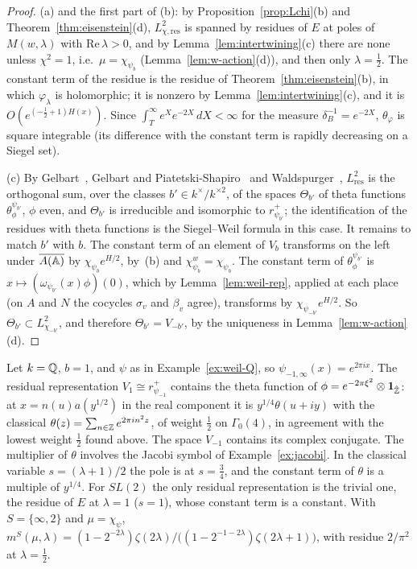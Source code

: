 \begin{proof}
(a) and the first part of (b): by Proposition~\ref{prop:Lchi}(b) and
Theorem~\ref{thm:eisenstein}(d), $L^2_{\chi,\mathrm{res}}$ is spanned by
residues of $E$ at poles of $M(w,\lambda)$ with $\mathrm{Re}\,\lambda>0$,
and by Lemma~\ref{lem:intertwining}(c) there are none unless
$\chi^2=1$, i.e.\ $\mu=\chi_{\psi_b}$ (Lemma~\ref{lem:w-action}(d)), and
then only $\lambda=\frac12$. The constant term of the residue is the
residue of Theorem~\ref{thm:eisenstein}(b), in which $\varphi_\lambda$ is
holomorphic; it is nonzero by Lemma~\ref{lem:intertwining}(c), and it is
$O(e^{(-\frac12+1)H(x)})$. Since $\int_T^\infty e^{X}e^{-2X}\,dX<\infty$
for the measure $\delta_B^{-1}=e^{-2X}$, $\theta_\varphi$ is square
integrable (its difference with the constant term is rapidly decreasing
on a Siegel set).

(c) By Gelbart~\cite{Ge76}, Gelbart and
Piatetski-Shapiro~\cite{GPS80} and Waldspurger~\cite{Wa80},
$L^2_{\mathrm{res}}$ is the orthogonal sum, over the classes $b'\in
k^\times/k^{\times2}$, of the spaces $\Theta_{b'}$ of theta functions
$\theta^{\psi_{b'}}_\phi$, $\phi$ even, and $\Theta_{b'}$ is irreducible
and isomorphic to $r^+_{\psi_{b'}}$; the identification of the residues
with theta functions is the Siegel--Weil formula in this case. It remains
to match $b'$ with $b$. The constant term of an element of $V_b$
transforms on the left under $\overline{A(\mathbb{A})}$ by $\chi_{\psi_b}e^{H/2}$,
by~(b) and $\chi_{\psi_b}^w=\chi_{\psi_b}$. The constant term of
$\theta^{\psi_{b'}}_\phi$ is $x\mapsto(\omega_{\psi_{b'}}(x)\phi)(0)$, which
by Lemma~\ref{lem:weil-rep}, applied at each place (on $A$ and $N$ the
cocycles $\sigma_v$ and $\beta_v$ agree), transforms by
$\chi_{\psi_{-b'}}e^{H/2}$. So $\Theta_{b'}\subset L^2_{\chi_{-b'}}$, and
therefore $\Theta_{b'}=V_{-b'}$, by the uniqueness in
Lemma~\ref{lem:w-action}(d).
\end{proof}

\begin{example}\label{ex:theta}
Let $k=\mathbb{Q}$, $b=1$, and $\psi$ as in Example~\ref{ex:weil-Q}, so
$\psi_{-1,\infty}(x)=e^{2\pi ix}$. The residual representation
$V_1\cong r^+_{\psi_{-1}}$ contains the theta function of
$\phi=e^{-2\pi\xi^2}\otimes\mathbf 1_{\hat{\mathbb{Z}}}$: at $x=n(u)a(y^{1/2})$ in
the real component it is $y^{1/4}\theta(u+iy)$ with the classical
$\theta(z)=\sum_{n\in\mathbb{Z}}e^{2\pi in^2z}$, of weight
$\frac12$ on $\Gamma_0(4)$, in agreement with the lowest weight
$\frac12$ found above. The space $V_{-1}$ contains its complex conjugate.
The multiplier of $\theta$ involves the Jacobi symbol of
Example~\ref{ex:jacobi}. In the classical variable $s=(\lambda+1)/2$ the
pole is at $s=\frac34$, and the constant term of $\theta$ is a multiple
of $y^{1/4}$. For $SL(2)$ the only residual representation is the trivial
one, the residue of $E$ at $\lambda=1$ ($s=1$), whose constant term is a
constant. With $S=\{\infty,2\}$ and $\mu=\chi_\psi$,
$m^S(\mu,\lambda)=(1-2^{-2\lambda})\zeta(2\lambda)/\bigl((1-2^{-1-2\lambda})
\zeta(2\lambda+1)\bigr)$, with residue $2/\pi^2$ at $\lambda=\frac12$.
\end{example}

